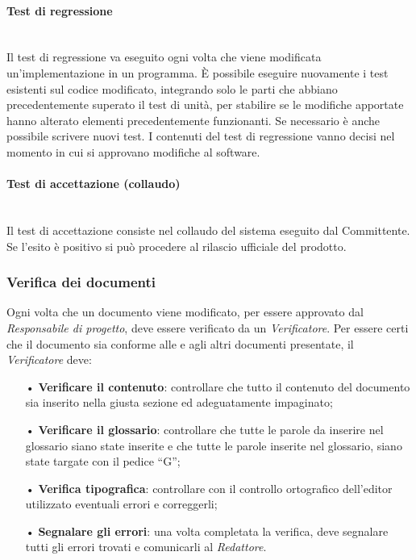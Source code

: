 {\paragraph{Test di regressione}\mbox{}\\
Il test di regressione va eseguito ogni volta che viene modificata un'implementazione in un programma. È possibile eseguire nuovamente i test esistenti sul codice modificato, integrando solo le parti che abbiano precedentemente superato il test di unità, per stabilire se le modifiche apportate hanno alterato elementi precedentemente funzionanti. Se necessario è anche possibile scrivere nuovi test. 
\newline
I contenuti del test di regressione vanno decisi nel momento in cui si approvano modifiche al software.
\paragraph{Test di accettazione (collaudo)}\mbox{}\\
Il test di accettazione consiste nel collaudo del sistema eseguito dal Committente. Se l'esito è positivo si può procedere al rilascio ufficiale del prodotto.

\subsubsection{Verifica dei documenti}
Ogni volta che un documento viene modificato, per essere approvato dal \textit{Responsabile di progetto}, deve essere verificato da un \textit{Verificatore}. 
\newline
Per essere certi che il documento sia conforme alle \NdP \space e agli altri documenti presentate, il \textit{Verificatore} deve:
\begin{itemize}
\item[•]\textbf{Verificare il contenuto}: controllare che tutto il contenuto del documento sia inserito nella giusta sezione ed adeguatamente impaginato;
\item[•] \textbf{Verificare il glossario}: controllare che tutte le parole da inserire nel glossario siano state inserite e che tutte le parole inserite nel glossario, siano state targate con il pedice “G”;
\item[•] \textbf{Verifica tipografica}: controllare con il controllo ortografico dell’editor utilizzato eventuali errori e correggerli;
\item[•] \textbf{Segnalare gli errori}: una volta completata la verifica, deve segnalare tutti gli errori trovati e comunicarli al \textit{Redattore}.
\end{itemize}
}
